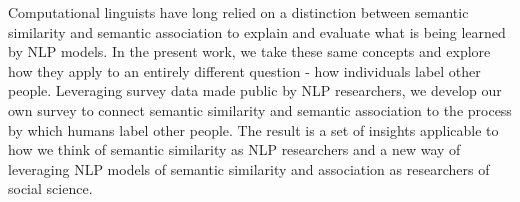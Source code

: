 Computational linguists have long relied on a distinction between semantic similarity and semantic association to explain and evaluate what is being learned by NLP models. In the present work, we take these same concepts and explore how they apply to an entirely different question - how individuals label other people. Leveraging survey data made public by NLP researchers, we develop our own survey to connect semantic similarity and semantic association to the process by which humans label other people. The result is a set of insights applicable to how we think of semantic similarity as NLP researchers and a new way of leveraging NLP models of semantic similarity and association as researchers of social science.

